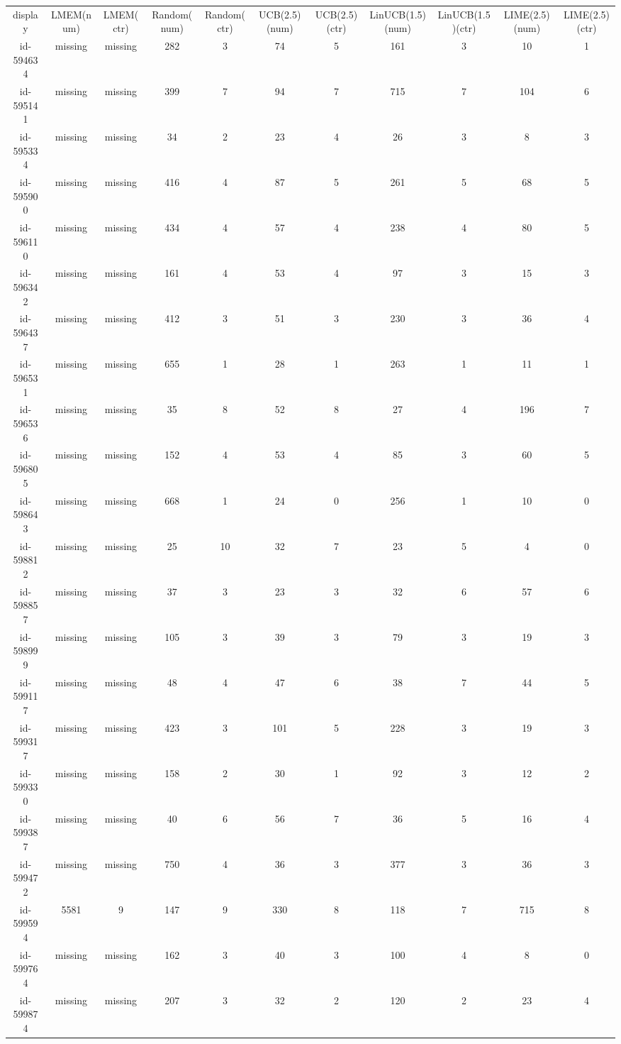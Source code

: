 \begin{tabular}{ccccccccccc}
display & LMEM(num) & LMEM(ctr) & Random(num) & Random(ctr) & UCB(2.5)(num) & UCB(2.5)(ctr) & LinUCB(1.5)(num) & LinUCB(1.5)(ctr) & LIME(2.5)(num) & LIME(2.5)(ctr)\\
id-594634 & missing & missing & 282 & 3 & 74 & 5 & 161 & 3 & 10 & 1\\
id-595141 & missing & missing & 399 & 7 & 94 & 7 & 715 & 7 & 104 & 6\\
id-595334 & missing & missing & 34 & 2 & 23 & 4 & 26 & 3 & 8 & 3\\
id-595900 & missing & missing & 416 & 4 & 87 & 5 & 261 & 5 & 68 & 5\\
id-596110 & missing & missing & 434 & 4 & 57 & 4 & 238 & 4 & 80 & 5\\
id-596342 & missing & missing & 161 & 4 & 53 & 4 & 97 & 3 & 15 & 3\\
id-596437 & missing & missing & 412 & 3 & 51 & 3 & 230 & 3 & 36 & 4\\
id-596531 & missing & missing & 655 & 1 & 28 & 1 & 263 & 1 & 11 & 1\\
id-596536 & missing & missing & 35 & 8 & 52 & 8 & 27 & 4 & 196 & 7\\
id-596805 & missing & missing & 152 & 4 & 53 & 4 & 85 & 3 & 60 & 5\\
id-598643 & missing & missing & 668 & 1 & 24 & 0 & 256 & 1 & 10 & 0\\
id-598812 & missing & missing & 25 & 10 & 32 & 7 & 23 & 5 & 4 & 0\\
id-598857 & missing & missing & 37 & 3 & 23 & 3 & 32 & 6 & 57 & 6\\
id-598999 & missing & missing & 105 & 3 & 39 & 3 & 79 & 3 & 19 & 3\\
id-599117 & missing & missing & 48 & 4 & 47 & 6 & 38 & 7 & 44 & 5\\
id-599317 & missing & missing & 423 & 3 & 101 & 5 & 228 & 3 & 19 & 3\\
id-599330 & missing & missing & 158 & 2 & 30 & 1 & 92 & 3 & 12 & 2\\
id-599387 & missing & missing & 40 & 6 & 56 & 7 & 36 & 5 & 16 & 4\\
id-599472 & missing & missing & 750 & 4 & 36 & 3 & 377 & 3 & 36 & 3\\
id-599594 & 5581 & 9 & 147 & 9 & 330 & 8 & 118 & 7 & 715 & 8\\
id-599764 & missing & missing & 162 & 3 & 40 & 3 & 100 & 4 & 8 & 0\\
id-599874 & missing & missing & 207 & 3 & 32 & 2 & 120 & 2 & 23 & 4\\

\end{tabular}
